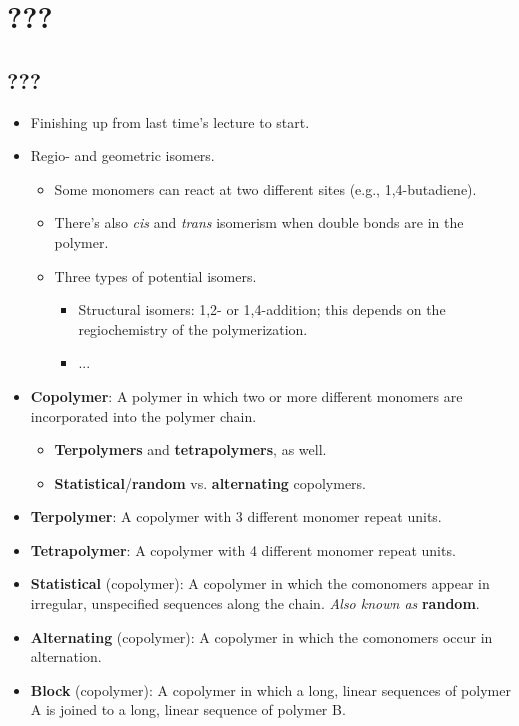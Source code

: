 \documentclass[../notes.tex]{subfiles}
\begin{document}
\chapter{???}
\section{???}
\begin{itemize}
    \item {}Finishing up from last time's lecture to start.
    \item Regio- and geometric isomers.
    \begin{itemize}
        \item Some monomers can react at two different sites (e.g., 1,4-butadiene).
        \item There's also \emph{cis} and \emph{trans} isomerism when double bonds are in the polymer.
        \item Three types of potential isomers.
        \begin{itemize}
            \item Structural isomers: 1,2- or 1,4-addition; this depends on the regiochemistry of the polymerization.
            \item ...
        \end{itemize}
    \end{itemize}
    \item \textbf{Copolymer}: A polymer in which two or more different monomers are incorporated into the polymer chain.
    \begin{itemize}
        \item \textbf{Terpolymers} and \textbf{tetrapolymers}, as well.
        \item \textbf{Statistical}/\textbf{random} vs. \textbf{alternating} copolymers.
    \end{itemize}
    \item \textbf{Terpolymer}: A copolymer with 3 different monomer repeat units.
    \item \textbf{Tetrapolymer}: A copolymer with 4 different monomer repeat units.
    \item \textbf{Statistical} (copolymer): A copolymer in which the comonomers appear in irregular, unspecified sequences along the chain. \emph{Also known as} \textbf{random}.
    \item \textbf{Alternating} (copolymer): A copolymer in which the comonomers occur in alternation.
    \item \textbf{Block} (copolymer): A copolymer in which a long, linear sequences of polymer A is joined to a long, linear sequence of polymer B.

\end{itemize}
\end{document}
